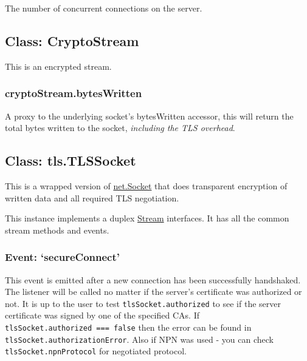 The number of concurrent connections on the server.

\subsection{Class: CryptoStream}\label{class-cryptostream}

\begin{Shaded}
\begin{Highlighting}[]
 \NormalTok{- }  
\end{Highlighting}
\end{Shaded}

This is an encrypted stream.

\subsubsection{cryptoStream.bytesWritten}\label{cryptostream.byteswritten}

A proxy to the underlying socket's bytesWritten accessor, this will
return the total bytes written to the socket, \emph{including the TLS
overhead}.

\subsection{Class: tls.TLSSocket}\label{class-tls.tlssocket-1}

This is a wrapped version of
\href{net.html\#net_class_net_socket}{net.Socket} that does transparent
encryption of written data and all required TLS negotiation.

This instance implements a duplex
\href{stream.html\#stream_stream}{Stream} interfaces. It has all the
common stream methods and events.

\subsubsection{\texorpdfstring{Event:
`secureConnect'}{Event: secureConnect}}\label{event-secureconnect}

This event is emitted after a new connection has been successfully
handshaked. The listener will be called no matter if the server's
certificate was authorized or not. It is up to the user to test
\texttt{tlsSocket.authorized} to see if the server certificate was
signed by one of the specified CAs. If
\texttt{tlsSocket.authorized\ ===\ false} then the error can be found in
\texttt{tlsSocket.authorizationError}. Also if NPN was used - you can
check \texttt{tlsSocket.npnProtocol} for negotiated protocol.

